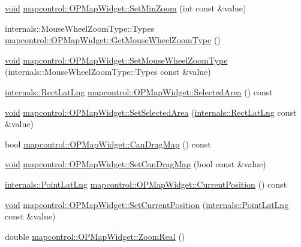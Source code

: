 \begin{DoxyCompactItemize}
\item 
\hyperlink{group___u_a_v_objects_plugin_ga444cf2ff3f0ecbe028adce838d373f5c}{void} \hyperlink{group___o_p_map_widget_gaf973bb53af546323b7714f8715bb527d}{mapcontrol\-::\-O\-P\-Map\-Widget\-::\-Set\-Min\-Zoom} (int const \&value)
\item 
internals\-::\-Mouse\-Wheel\-Zoom\-Type\-::\-Types \hyperlink{group___o_p_map_widget_gaccdd5b2b818dd9add21788954c49eabe}{mapcontrol\-::\-O\-P\-Map\-Widget\-::\-Get\-Mouse\-Wheel\-Zoom\-Type} ()
\item 
\hyperlink{group___u_a_v_objects_plugin_ga444cf2ff3f0ecbe028adce838d373f5c}{void} \hyperlink{group___o_p_map_widget_ga24fd1f0f732f8306c89d00997f9957e1}{mapcontrol\-::\-O\-P\-Map\-Widget\-::\-Set\-Mouse\-Wheel\-Zoom\-Type} (internals\-::\-Mouse\-Wheel\-Zoom\-Type\-::\-Types const \&value)
\item 
\hyperlink{structinternals_1_1_rect_lat_lng}{internals\-::\-Rect\-Lat\-Lng} \hyperlink{group___o_p_map_widget_gaa5afd1049e526ae7424065bca8308106}{mapcontrol\-::\-O\-P\-Map\-Widget\-::\-Selected\-Area} () const 
\item 
\hyperlink{group___u_a_v_objects_plugin_ga444cf2ff3f0ecbe028adce838d373f5c}{void} \hyperlink{group___o_p_map_widget_ga39fb72ad777f823ecaba3f30feb9e623}{mapcontrol\-::\-O\-P\-Map\-Widget\-::\-Set\-Selected\-Area} (\hyperlink{structinternals_1_1_rect_lat_lng}{internals\-::\-Rect\-Lat\-Lng} const \&value)
\item 
bool \hyperlink{group___o_p_map_widget_ga2c73815e5add0186091174a0dabad975}{mapcontrol\-::\-O\-P\-Map\-Widget\-::\-Can\-Drag\-Map} () const 
\item 
\hyperlink{group___u_a_v_objects_plugin_ga444cf2ff3f0ecbe028adce838d373f5c}{void} \hyperlink{group___o_p_map_widget_ga8e9c310f8929536de86a8ed730abde94}{mapcontrol\-::\-O\-P\-Map\-Widget\-::\-Set\-Can\-Drag\-Map} (bool const \&value)
\item 
\hyperlink{structinternals_1_1_point_lat_lng}{internals\-::\-Point\-Lat\-Lng} \hyperlink{group___o_p_map_widget_ga5da99e2dca74bad302e2a35466a5a2fc}{mapcontrol\-::\-O\-P\-Map\-Widget\-::\-Current\-Position} () const 
\item 
\hyperlink{group___u_a_v_objects_plugin_ga444cf2ff3f0ecbe028adce838d373f5c}{void} \hyperlink{group___o_p_map_widget_ga5144489a16c9bd07abbd0d8adc01656d}{mapcontrol\-::\-O\-P\-Map\-Widget\-::\-Set\-Current\-Position} (\hyperlink{structinternals_1_1_point_lat_lng}{internals\-::\-Point\-Lat\-Lng} const \&value)
\item 
double \hyperlink{group___o_p_map_widget_gae56c86fccffa01f54944d431af98a7b9}{mapcontrol\-::\-O\-P\-Map\-Widget\-::\-Zoom\-Real} ()

\end{DoxyCompactItemize}
